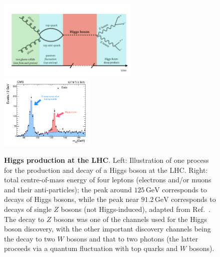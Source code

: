 \documentclass[12pt]{article}
\begin{document}
\begin{figure}
  \centering
  \includegraphics[width=0.6\textwidth]{figs/Fig3a.pdf}%
    \includegraphics[width=0.4\textwidth]{figs/Fig3-CMS.pdf}
  \caption{{\bf Higgs production at the LHC}. Left:
    Illustration of one process for the production and decay of a Higgs
    boson at the LHC.
    Right: total centre-of-mass energy of four leptons (electrons
    and/or muons and their anti-particles); the peak around
    $125\,\text{GeV}$ corresponds to decays of Higgs bosons, while the
    peak near $91.2\,\text{GeV}$ corresponds to decays of single $Z$
    bosons (not Higgs-induced), adapted from Ref.~\cite{CMS:2021ugl}.
    The decay to $Z$ bosons was one of the channels used
    for the Higgs boson discovery, with the other important
    discovery channels being the decay to two $W$ bosons and that to two
    photons (the latter proceeds via a quantum fluctuation with top
    quarks and $W$ bosons). 
  }
  \label{fig:higgs-prod-decay}
\end{figure}
\end{document}
